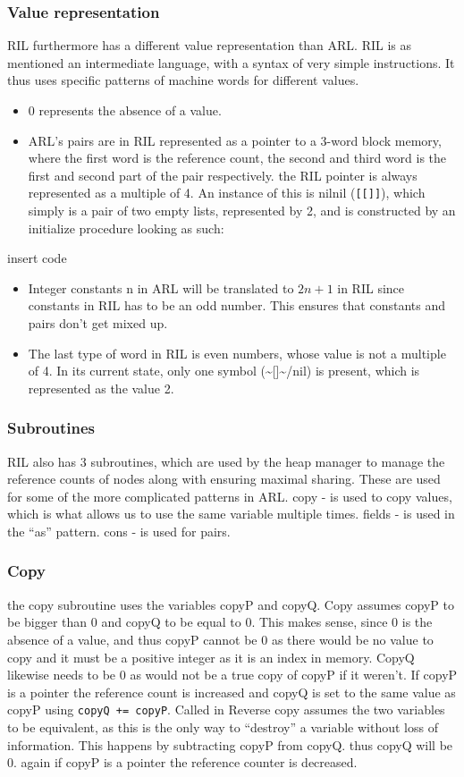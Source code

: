 \documentclass[a4paper]{article}
\begin{document}
\subsubsection{Value representation}
\label{sec:orgaf9dd9b}
RIL furthermore has a different value representation than ARL. RIL is as mentioned an intermediate language, with a syntax of very simple instructions. It thus uses specific patterns of machine words for different values.
\begin{itemize}
\item 0 represents the absence of a value.
\item ARL's pairs are in RIL represented as a pointer to a 3-word block memory, where the first word is the reference count, the second and third word is the first and second part of the pair respectively. the RIL pointer is always represented as a multiple of 4. An instance of this is nilnil (\texttt{[[]]}), which simply is a pair of two empty lists, represented by 2, and is constructed by an initialize procedure looking as such:
\end{itemize}
insert code
\begin{itemize}
\item Integer constants n in ARL will be translated to \(2n+1\) in RIL since constants in RIL has to be an odd number. This ensures that constants and pairs don't get mixed up.
\item The last type of word in RIL is even numbers, whose value is not a multiple of 4.  In its current state, only one symbol (\textasciitilde{}[]\textasciitilde{}/nil) is present, which is represented as the value 2.
\end{itemize}
\subsubsection{Subroutines}
\label{sec:orgd3f0b1c}
RIL also has 3 subroutines, which are used by the heap manager to manage the reference counts of nodes along with ensuring maximal sharing. These are used for some of the more complicated patterns in ARL.
copy - is used to copy values, which is what allows us to use the same variable multiple times.
fields - is used in the ``as'' pattern.
cons - is used for pairs.
\subsubsection{Copy}
\label{sec:org473e38b}
the copy subroutine uses the variables copyP and copyQ. Copy assumes copyP to be bigger than 0 and copyQ to be equal to 0. This makes sense, since 0 is the absence of a value, and thus copyP cannot be 0 as there would be no value to copy and it must be a positive integer as it is an index in memory. CopyQ likewise needs to be 0 as would not be a true copy of copyP if it weren't. If copyP is a pointer the reference count is increased and copyQ is set to the same value as copyP using \texttt{copyQ += copyP}. Called in Reverse copy assumes the two variables to be equivalent, as this is the only way to ``destroy'' a variable without loss of information. This happens by subtracting copyP from copyQ. thus copyQ will be 0. again if copyP is a pointer the reference counter is decreased.
\end{document}
